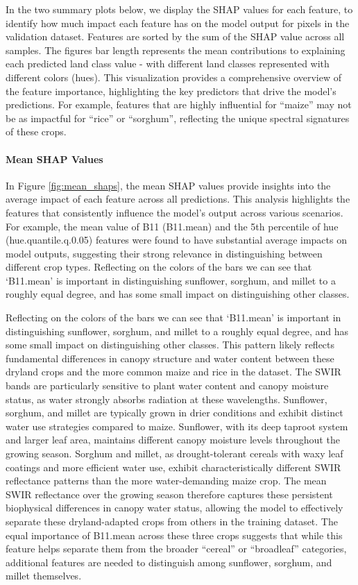 \documentclass[
  journal,
  twocolumn]{IEEEtran}
\begin{document}
In the two summary plots below, we display the SHAP values for each
feature, to identify how much impact each feature has on the model
output for pixels in the validation dataset. Features are sorted by the
sum of the SHAP value across all samples. The figures bar length
represents the mean contributions to explaining each predicted land
class value - with different land classes represented with different
colors (hues). This visualization provides a comprehensive overview of
the feature importance, highlighting the key predictors that drive the
model's predictions. For example, features that are highly influential
for ``maize'' may not be as impactful for ``rice'' or ``sorghum'',
reflecting the unique spectral signatures of these crops.

\hypertarget{mean-shap-values}{%
\paragraph{Mean SHAP Values}\label{mean-shap-values}}

In Figure \ref{fig:mean_shaps}, the mean SHAP values provide insights
into the average impact of each feature across all predictions. This
analysis highlights the features that consistently influence the model's
output across various scenarios. For example, the mean value of B11
(B11.mean) and the 5th percentile of hue (hue.quantile.q.0.05) features
were found to have substantial average impacts on model outputs,
suggesting their strong relevance in distinguishing between different
crop types. Reflecting on the colors of the bars we can see that
`B11.mean' is important in distinguishing sunflower, sorghum, and millet
to a roughly equal degree, and has some small impact on distinguishing
other classes.

Reflecting on the colors of the bars we can see that `B11.mean' is
important in distinguishing sunflower, sorghum, and millet to a roughly
equal degree, and has some small impact on distinguishing other classes.
This pattern likely reflects fundamental differences in canopy structure
and water content between these dryland crops and the more common maize
and rice in the dataset. The SWIR bands are particularly sensitive to
plant water content and canopy moisture status, as water strongly
absorbs radiation at these wavelengths. Sunflower, sorghum, and millet
are typically grown in drier conditions and exhibit distinct water use
strategies compared to maize. Sunflower, with its deep taproot system
and larger leaf area, maintains different canopy moisture levels
throughout the growing season. Sorghum and millet, as drought-tolerant
cereals with waxy leaf coatings and more efficient water use, exhibit
characteristically different SWIR reflectance patterns than the more
water-demanding maize crop. The mean SWIR reflectance over the growing
season therefore captures these persistent biophysical differences in
canopy water status, allowing the model to effectively separate these
dryland-adapted crops from others in the training dataset. The equal
importance of B11.mean across these three crops suggests that while this
feature helps separate them from the broader ``cereal'' or ``broadleaf''
categories, additional features are needed to distinguish among
sunflower, sorghum, and millet themselves.
\end{document}
